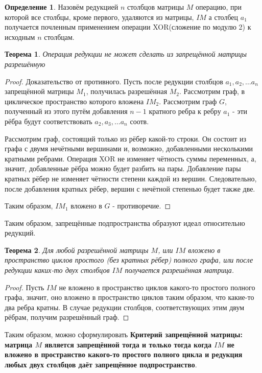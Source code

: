 \documentclass[a4paper]{article}
\newtheorem{theorem}{Теорема}[section]
\theoremstyle{definition}
\newtheorem{definition}{Определение}[section]
\begin{document}
\begin{definition}
	Назовём редукцией $n$ столбцов матрицы $M$ операцию, при которой все столбцы, кроме первого, удаляются из матрицы, $IM$ а столбец $a_1$ получается почленным применением операции XOR(сложение по модулю 2) к исходным $n$ столбцам.
\end{definition}
\begin{theorem}
	Операция редукции не может сделать из запрещённой матрицы разрешённую
\end{theorem}
\begin{proof}
	Доказательство от противного. Пусть после редукции столбцов $a_1, a_2, \ldots a_n$ запрещённой матрицы $M_1$, получилась разрешённая $M_2$. Рассмотрим граф, в циклическое пространство которого вложена $IM_2$. Рассмотрим граф $G$, полученный из этого путём добавления $n - 1$ кратного ребра к ребру $a_1$ - эти рёбра будут соответствовать $a_2, a_3, \ldots a_n$ соотв. 
	
	Рассмотрим граф, состоящий только из рёбер какой-то строки. Он состоит из графа с двумя нечётными вершинами и, возможно, добавленными несколькими кратными ребрами. Операция XOR не изменяет чётность суммы переменных, а, значит, добавленные рёбра можно будет разбить на пары. Добавление пары кратных рёбер не изменяет чётности степени каждой из вершин. Следовательно, после добавления кратных рёбер, вершин с нечётной степенью будет также две.
	
	Таким образом, $IM_1$ вложено в $G$ - противоречие.
\end{proof}

Таким образом, запрещённые подпространства образуют идеал относительно редукций.

\begin{theorem}
	Для любой разрешённой матрицы $M$, или $IM$ вложено в пространство циклов простого (без кратных рёбер) полного графа, или после редукции каких-то двух столбцов $IM$ получается разрешённая матрица.
\end{theorem}
\begin{proof}
	Пусть $IM$ не вложено в пространство циклов какого-то простого полного графа, значит, оно вложено в пространство циклов таким образом, что какие-то два ребра кратны. В случае редукции столбцов, соответствующих этим двум рёбрам, получим разрешённый граф.
\end{proof}

Таким образом, можно сформулировать \textbf{Критерий запрещённой матрицы: матрица $M$ является запрещённой тогда и только тогда когда $IM$ не вложено в пространство какого-то простого полного цикла и редукция любых двух столбцов даёт запрещённое подпространство}.
\end{document}
